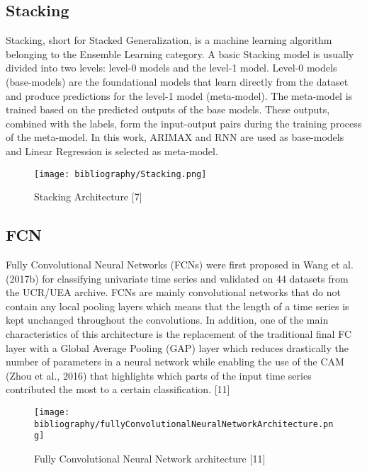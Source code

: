 \documentclass{ieeeojies}
\begin{document}
\subsection{Stacking}

Stacking, short for Stacked Generalization, is a machine learning algorithm belonging to the Ensemble Learning category. A basic Stacking model is usually divided into two levels: level-0 models and the level-1 model. Level-0 models (base-models) are the foundational models that learn directly from the dataset and produce predictions for the level-1 model (meta-model). The meta-model is trained based on the predicted outputs of the base models. These outputs, combined with the labels, form the input-output pairs during the training process of the meta-model. In this work, ARIMAX and RNN are used as base-models and Linear Regression is selected as meta-model.  
\begin{figure}[H]
  \centering
  \begin{minipage}{0.9\linewidth}
    \centering
    \texttt{[image: bibliography/Stacking.png]}
    \caption{Stacking Architecture [7]}
    \label{fig8}
  \end{minipage}
\end{figure}


\subsection{FCN}
Fully Convolutional Neural Networks (FCNs) were first proposed in Wang et al. (2017b) for classifying univariate time series and validated on 44 datasets from the UCR/UEA archive. FCNs are mainly convolutional networks that do not contain any local pooling layers which means that the length of a time series is kept unchanged throughout the convolutions. In addition, one of the main characteristics of this architecture is the replacement of the traditional final FC layer with a Global Average Pooling (GAP) layer which reduces drastically the number of parameters in a neural network while enabling the use of the CAM (Zhou et al., 2016) that highlights which parts of the input time series contributed the most to a certain classification.  [11]
\begin{figure}[H]
    \centering
    \begin{minipage}{1\linewidth}
        \centering
        \texttt{[image: bibliography/fullyConvolutionalNeuralNetworkArchitecture.png]}
        \caption{Fully Convolutional Neural Network architecture [11]}
        \label{fig11}
    \end{minipage}
\end{figure}
\end{document}

